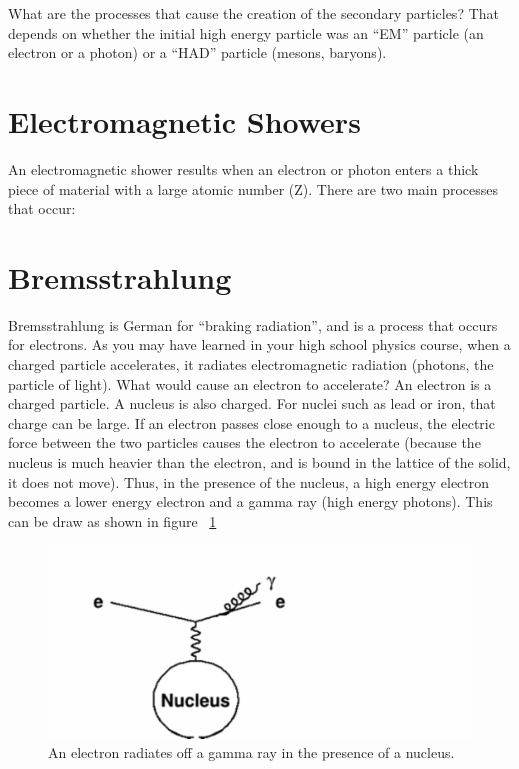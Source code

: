 \;

\noindent
What are the processes that cause the creation of the secondary particles? That depends on whether the initial high energy particle was an ``EM'' particle (an electron or a photon) or a ``HAD'' particle (mesons, baryons).

\section{Electromagnetic Showers}

\noindent
An electromagnetic shower results when an electron or photon enters a thick piece of material with a large atomic number (Z). There are two main processes that occur:

\section{Bremsstrahlung}

\noindent
Bremsstrahlung is German for ``braking radiation'', and is a process that occurs for electrons. As you may have learned in your high school physics course, when a charged particle accelerates, it radiates electromagnetic radiation (photons, the particle of light). What would cause an electron to accelerate? An electron is a charged particle. A nucleus is also charged. For nuclei such as lead or iron, that charge can be large. If an electron passes close enough to a nucleus, the electric force between the two particles causes the electron to accelerate (because the nucleus is much heavier than the electron, and is bound in the lattice of the solid, it does not move). Thus, in the presence of the nucleus, a high energy electron becomes a lower energy electron and a gamma ray (high energy photons). This can be draw as shown in figure ~\ref{fig:cal2}


\;
\;

\begin{figure}[h]
\centering\includegraphics[scale=0.7]{./calorimetry/Pictures/fig2.pdf}
\caption{An electron radiates off a gamma ray in the presence of a nucleus.}
\label{fig:cal2}
\end{figure}

